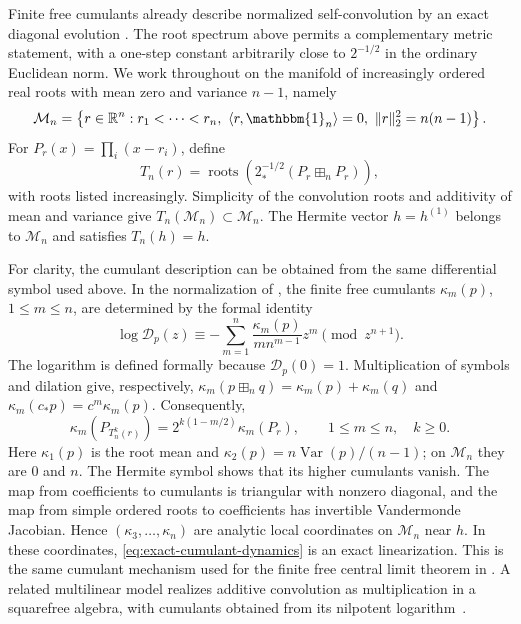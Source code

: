 \documentclass[12pt,reqno]{amsart}
\theoremstyle{definition}
\theoremstyle{remark}
\newcommand{\R}{\mathbb R}
\newcommand{\one}{\mathbbm{1}_n}
\newcommand{\Var}{\operatorname{Var}}
\newcommand{\cM}{\mathcal M}
\begin{document}
Finite free cumulants already describe normalized self-convolution by an
exact diagonal evolution \cite{AP18}. The root spectrum above permits a
complementary metric statement, with a one-step constant arbitrarily close
to \(2^{-1/2}\) in the ordinary Euclidean norm.  We work throughout on the
manifold of increasingly ordered real roots with mean zero and variance
\(n-1\), namely
\begin{equation}\label{eq:intro-shape-manifold}
 \cM_n=\left\{r\in\R^n:r_1<\cdots<r_n,
 \ \langle r,\one\rangle=0,
 \ \lVert r\rVert_2^2=n(n-1)\right\}.
\end{equation}
For \(P_r(x)=\prod_i(x-r_i)\), define
\begin{equation}\label{eq:intro-T}
 T_n(r)=\operatorname{roots}\!\left(
 2^{-1/2}_*(P_r\boxplus_nP_r)\right),
\end{equation}
with roots listed increasingly. Simplicity of the convolution roots and
additivity of mean and variance give \(T_n(\cM_n)\subset\cM_n\).
The Hermite vector \(h=h^{(1)}\) belongs to \(\cM_n\) and satisfies
\(T_n(h)=h\).

For clarity, the cumulant description can be obtained from the same
differential symbol used above. In the normalization of \cite{AP18}, the
finite free cumulants \(\kappa_m(p)\), \(1\leq m\leq n\), are determined by
the formal identity
\begin{equation}\label{eq:finite-free-cumulant-symbol}
 \log\mathcal D_p(z)
 \equiv-\sum_{m=1}^n\frac{\kappa_m(p)}{m n^{m-1}}z^m
 \pmod{z^{n+1}}.
\end{equation}
The logarithm is defined formally because \(\mathcal D_p(0)=1\).
Multiplication of symbols and dilation give, respectively,
\(\kappa_m(p\boxplus_nq)=\kappa_m(p)+\kappa_m(q)\) and
\(\kappa_m(c_*p)=c^m\kappa_m(p)\).  Consequently,
\begin{equation}\label{eq:exact-cumulant-dynamics}
 \kappa_m(P_{T_n^k(r)})
 =2^{k(1-m/2)}\kappa_m(P_r),
 \qquad 1\leq m\leq n,\quad k\geq0.
\end{equation}
Here \(\kappa_1(p)\) is the root mean and
\(\kappa_2(p)=n\Var(p)/(n-1)\); on \(\cM_n\) they are \(0\) and \(n\).
The Hermite symbol shows that its higher cumulants vanish.  The map from
coefficients to cumulants is triangular with nonzero diagonal, and the map
from simple ordered roots to coefficients has invertible Vandermonde
Jacobian.  Hence \((\kappa_3,\ldots,\kappa_n)\) are analytic local
coordinates on \(\cM_n\) near \(h\).  In these coordinates,
\eqref{eq:exact-cumulant-dynamics} is an exact linearization. This is the
same cumulant mechanism used for the finite free central limit theorem in
\cite[Example~6.1]{AP18}. A related multilinear model realizes additive convolution as multiplication in a squarefree algebra, with cumulants obtained
from its nilpotent logarithm~\cite[\S4]{Sinclair26}.
\end{document}
